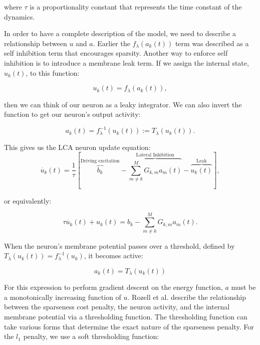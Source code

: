 \noindent where $\tau$ is a proportionality constant that represents the time constant of the dynamics.

In order to have a complete description of the model, we need to describe a relationship between $u$ and $a$. Earlier the $f_{\lambda}(a_{k}(t))$ term was described as a self inhibition term that encourages sparsity. Another way to enforce self inhibition is to introduce a membrane leak term. If we assign the internal state, $u_{k}(t)$, to this function:

\begin{equation}\label{eq:ch2_u_func_a}
    u_k(t) = f_{\lambda}(a_{k}(t)),
\end{equation}

\noindent then we can think of our neuron as a leaky integrator. We can also invert the function to get our neuron's output activity:

\begin{displaymath}\label{eq:ch2_a_fu_thresh}
    a_{k}(t) = f_{\lambda}^{-1}(u_{k}(t)) := T_{\lambda}(u_{k}(t)).
\end{displaymath}

This gives us the LCA neuron update equation:
\begin{equation}\label{eq:ch2_u_dot_full}
    \dot{u_{k}}(t) = \frac{1}{\tau} \left[\overbrace{b_{k}}^\text{Driving excitation} - \overbrace{\sum_{m \neq k}^{M}G_{k,m}a_{m}(t)}^\text{Lateral Inhibition} - \overbrace{u_{k}(t)}^\text{Leak} \right],
\end{equation}

\noindent or equivalently:

\begin{displaymath}
    \tau \dot{u_{k}}(t) + u_{k}(t) =  b_{k} - \sum_{m \neq k}^{M}G_{k,m}a_{m}(t).
\end{displaymath}

When the neuron's membrane potential passes over a threshold, defined by $T_{\lambda}(u_{k}(t)) = f_{\lambda}^{-1}(u_{k})$, it becomes active:

\begin{equation}\label{eq:ch2_a_thresh}
  a_{k}(t) = T_{\lambda}(u_{k}(t))
\end{equation}

For this expression to perform gradient descent on the energy function, $a$ must be a monotonically increasing function of $u$. Rozell et al. \citeyearpar{rozell2008sparse} describe the relationship between the sparseness cost penalty, the neuron activity, and the internal membrane potential via a thresholding function. The thresholding function can take various forms that determine the exact nature of the sparseness penalty. For the $l_{1}$ penalty, we use a soft thresholding function:

